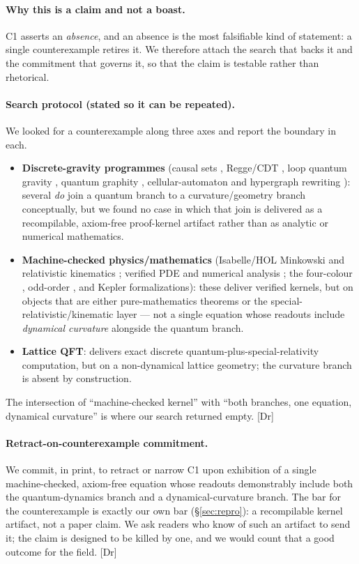 \documentclass[10pt,twocolumn]{article}
\theoremstyle{definition}
\newcommand{\Dr}{\textsf{[Dr]}}
\begin{document}
\paragraph{Why this is a claim and not a boast.} C1 asserts an \emph{absence}, and an
absence is the most falsifiable kind of statement: a single counterexample retires it.
We therefore attach the search that backs it and the commitment that governs it, so that
the claim is testable rather than rhetorical.

\paragraph{Search protocol (stated so it can be repeated).} We looked for a counterexample
along three axes and report the boundary in each.
\begin{itemize}\itemsep2pt
\item \textbf{Discrete-gravity programmes} (causal sets \cite{bombelli1987,surya2019},
  Regge/CDT \cite{regge1961,cdt2005}, loop quantum gravity \cite{rovellismolin1990},
  quantum graphity \cite{graphity2008}, cellular-automaton \cite{thooftca2016} and hypergraph
  rewriting \cite{wolfram2020}): several \emph{do} join a
  quantum branch to a curvature/geometry branch conceptually, but we found no case in which
  that join is delivered as a recompilable, axiom-free proof-kernel artifact rather than as
  analytic or numerical mathematics.
\item \textbf{Machine-checked physics/mathematics} (Isabelle/HOL Minkowski and relativistic
  kinematics \cite{stannett2014,schutzformal2022,minkowski1909}; verified PDE and numerical
  analysis \cite{boldo2013}; the four-colour \cite{gonthier2008}, odd-order
  \cite{feitthompson2013}, and Kepler \cite{hales2017} formalizations): these deliver
  verified kernels, but on objects that are either
  pure-mathematics theorems or the special-relativistic/kinematic layer --- not a single
  equation whose readouts include \emph{dynamical curvature} alongside the quantum branch.
\item \textbf{Lattice QFT}: delivers exact discrete quantum-plus-special-relativity
  computation, but on a non-dynamical lattice geometry; the curvature branch is absent by
  construction.
\end{itemize}
The intersection of ``machine-checked kernel'' with ``both branches, one equation, dynamical
curvature'' is where our search returned empty. \Dr{}

\paragraph{Retract-on-counterexample commitment.} We commit, in print, to retract or
narrow C1 upon exhibition of a single machine-checked, axiom-free equation whose readouts
demonstrably include both the quantum-dynamics branch and a dynamical-curvature branch. The
bar for the counterexample is exactly our own bar (\S\ref{sec:repro}): a recompilable
kernel artifact, not a paper claim. We ask readers who know of such an artifact to send it;
the claim is designed to be killed by one, and we would count that a good outcome for the
field. \Dr{}
\end{document}
